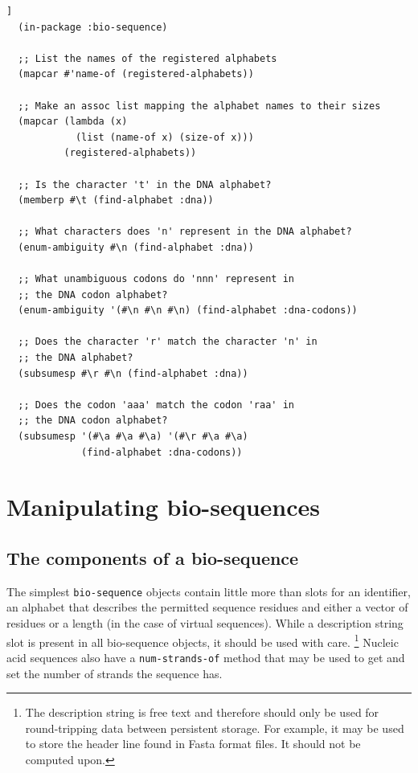 \documentclass[a4paper, 12pt]{article}
\begin{document}
\begin{lstlisting}[caption={Using bio-sequence alphabets},
  label=lst:using-bioseq-alphabets,float=[tbph]]
  (in-package :bio-sequence)
  
  ;; List the names of the registered alphabets
  (mapcar #'name-of (registered-alphabets))

  ;; Make an assoc list mapping the alphabet names to their sizes
  (mapcar (lambda (x)
            (list (name-of x) (size-of x)))
          (registered-alphabets))

  ;; Is the character 't' in the DNA alphabet?
  (memberp #\t (find-alphabet :dna))

  ;; What characters does 'n' represent in the DNA alphabet?
  (enum-ambiguity #\n (find-alphabet :dna))

  ;; What unambiguous codons do 'nnn' represent in
  ;; the DNA codon alphabet?
  (enum-ambiguity '(#\n #\n #\n) (find-alphabet :dna-codons))

  ;; Does the character 'r' match the character 'n' in
  ;; the DNA alphabet?
  (subsumesp #\r #\n (find-alphabet :dna))

  ;; Does the codon 'aaa' match the codon 'raa' in
  ;; the DNA codon alphabet?
  (subsumesp '(#\a #\a #\a) '(#\r #\a #\a)
             (find-alphabet :dna-codons))
\end{lstlisting}


\section{Manipulating bio-sequences}
\label{sec:manipulating-bioseq}

\subsection{The components of a bio-sequence}
\label{sec:components-of-bioseq}

The simplest \lstinline!bio-sequence! objects contain little more than
slots for an identifier, an alphabet that describes the permitted
sequence residues and either a vector of residues or a length (in the
case of virtual sequences). While a description string slot is present
in all bio-sequence objects, it should be used with
care. \footnote{The description string is free text and therefore
  should only be used for round-tripping data between persistent
  storage. For example, it may be used to store the header line found
  in Fasta format files. It should not be computed upon.}  Nucleic
acid sequences also have a \lstinline!num-strands-of! method that may
be used to get and set the number of strands the sequence has.
\end{document}
